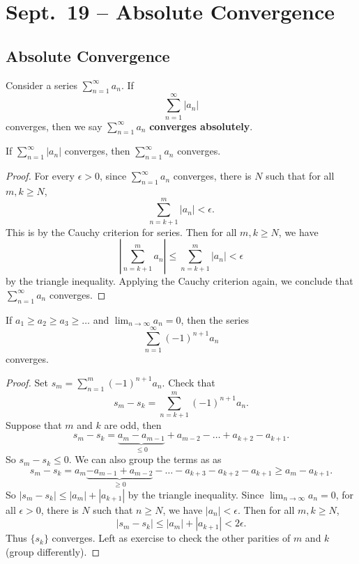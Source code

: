 \chapter{Sept.~19 -- Absolute Convergence}

\section{Absolute Convergence}

\begin{definition}
  Consider a series $\sum_{n=1}^\infty a_n$. If
  \[\sum_{n=1}^\infty |a_n|\]
  converges, then we say
  $\sum_{n=1}^\infty a_n$ \textbf{converges absolutely}.
\end{definition}

\begin{theorem}
  If $\sum_{n=1}^\infty |a_n|$ converges,
  then $\sum_{n = 1}^\infty a_n$ converges.
\end{theorem}

\begin{proof}
  For every $\epsilon > 0$, since $\sum_{n=1}^\infty a_n$
  converges, there is $N$ such that for all
  $m, k \ge N$,
  \[\sum_{n=k + 1}^m |a_n| < \epsilon.\]
  This is by the Cauchy criterion for series.
  Then for all $m, k \ge N$, we have
  \[
    \left\lvert \sum_{n=k+1}^m a_n\right\rvert
    \le \sum_{n=k+1}^m |a_n|
    < \epsilon
  \]
  by the triangle inequality. Applying
  the Cauchy criterion again, we conclude that
  $\sum_{n=1}^\infty a_n$ converges.
\end{proof}

\begin{theorem}
  If $a_1 \ge a_2 \ge a_3 \ge \dots$ and
  $\lim_{n \to \infty} a_n = 0$, then
  the series
  \[
    \sum_{n = 1}^\infty (-1)^{n + 1} a_n
  \]
  converges.
\end{theorem}

\begin{proof}
  Set $s_m = \sum_{n=1}^m (-1)^{n+1} a_n$. Check
  that
  \[s_m - s_k = \sum_{n=k+1}^m (-1)^{n+1} a_n.\]
  Suppose that $m$ and $k$ are odd, then
  \[
    s_m - s_k = \underbrace{a_m - a_{m - 1}}_{\le 0} + a_{m-2} -
    \dots + a_{k + 2} - a_{k + 1}
  .\]
  So $s_m - s_k \le 0$.
  We can also group the terms as as
  \[
    s_m - s_k = a_m \underbrace{- a_{m - 1} + a_{m - 2}}_{\ge 0} -
    \dots - a_{k + 3} - a_{k + 2} - a_{k + 1}
    \ge a_{m} - a_{k + 1}
  .\]
  So $|s_m - s_k| \le |a_m| + |a_{k + 1}|$ by the
  triangle inequality.
  Since $\lim_{n \to \infty} a_n = 0$, for all
  $\epsilon > 0$, there is $N$ such that $n \ge N$,
  we have $|a_n| < \epsilon$. Then for all $m, k \ge N$,
  \[
    |s_m - s_k| \le |a_m| + |a_{k + 1}| < 2\epsilon
  .\]
  Thus $\{s_k\}$ converges.
  Left as exercise to check the other parities of
  $m$ and $k$ (group differently).
\end{proof}

